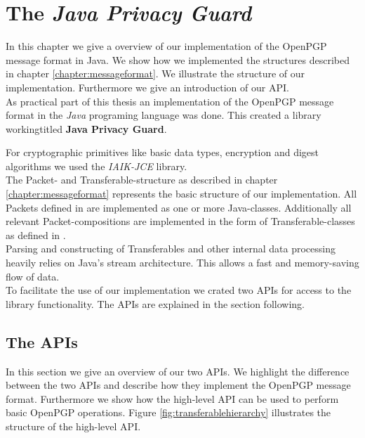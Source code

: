 \chapter{The \textit{Java Privacy Guard}} \label{chapter:jpg}

In this chapter we give a overview of our implementation of the OpenPGP message format in Java. We show how we implemented the structures described in chapter \ref{chapter:messageformat}. We illustrate the structure of our implementation. Furthermore we give an introduction of our API. \\


As practical part of this thesis an implementation of the OpenPGP message format \cite{RFC4880} in the \textit{Java} programing language was done. This created a library workingtitled \textbf{Java Privacy Guard}.

For cryptographic primitives like basic data types, encryption and digest algorithms we used the \textit{IAIK-JCE} library. \\

The Packet- and Transferable-structure as described in chapter \ref{chapter:messageformat} represents the basic structure of our implementation. All Packets defined in \cite[section 5]{RFC4880} are implemented as one or more Java-classes. Additionally all relevant Packet-compositions are implemented in the form of Transferable-classes as defined in \cite[section 11]{RFC4880}. \\

Parsing and constructing of Transferables and other internal data processing heavily relies on Java's stream architecture. This allows a fast and memory-saving flow of data. \\

To facilitate the use of our implementation we crated two APIs for access to the library functionality. The APIs are explained in the section following.

\section{The APIs}

In this section we give an overview of our two APIs. We highlight the difference between the two APIs and describe how they implement the OpenPGP message format. Furthermore we show how the high-level API can be used to perform basic OpenPGP operations. Figure \ref{fig:transferablehierarchy} illustrates the structure of the high-level API. \\

